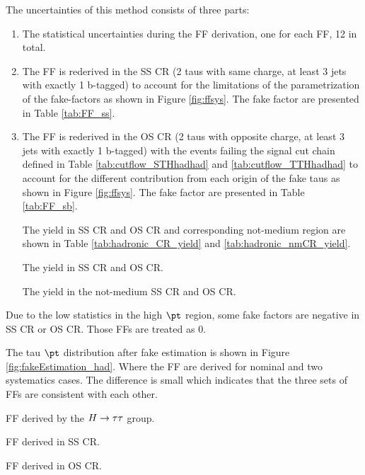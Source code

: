 The uncertainties of this method consists of three parts:
\begin{enumerate}

\item The statistical uncertainties during the FF derivation, one for each FF, 12 in total.

\item The FF is rederived in the SS CR (2 taus with same charge, at least 3 jets with exactly 1 b-tagged) to account for the limitations of the parametrization of the fake-factors as shown in Figure \ref{fig:ffsys}. The fake factor are presented in Table \ref{tab:FF_ss}. 

\item The FF is rederived in the OS CR (2 taus with opposite charge, at least 3 jets with exactly 1 b-tagged) with the events failing the signal cut chain defined in Table \ref{tab:cutflow_STHhadhad} and \ref{tab:cutflow_TTHhadhad} to account for the different contribution from each origin of the fake taus as shown in Figure \ref{fig:ffsys}. The fake factor are presented in Table \ref{tab:FF_sb}.

The yield in SS CR and OS CR and corresponding not-medium region are shown in Table \ref{tab:hadronic_CR_yield} and \ref{tab:hadronic_nmCR_yield}.

\begin{table}
\caption{The yield in SS CR and OS CR.}
\label{tab:hadronic_CR_yield}

\end{table}

\begin{table}
\caption{The yield in the not-medium SS CR and OS CR.}
\label{tab:hadronic_nmCR_yield}

\end{table}

\end{enumerate}



Due to the low statistics in the high $\pt$ region, some fake factors are negative in SS CR or OS CR. Those FFs are treated as 0.

The tau $\pt$ distribution after fake estimation is shown in Figure \ref{fig:fakeEstimation_had}. Where the FF are derived for nominal and two systematics cases. The difference is small which indicates that the three sets of FFs are consistent with each other.



\begin{table}
\caption{FF derived by the $H \rightarrow \tau\tau$ group.}
\label{tab:FF_htautau}

\end{table}

\begin{table}
\caption{FF derived in SS CR.}
\label{tab:FF_ss}

\end{table}

\begin{table}
\caption{FF derived in OS CR.}
\label{tab:FF_sb}

\end{table}

\clearpage
